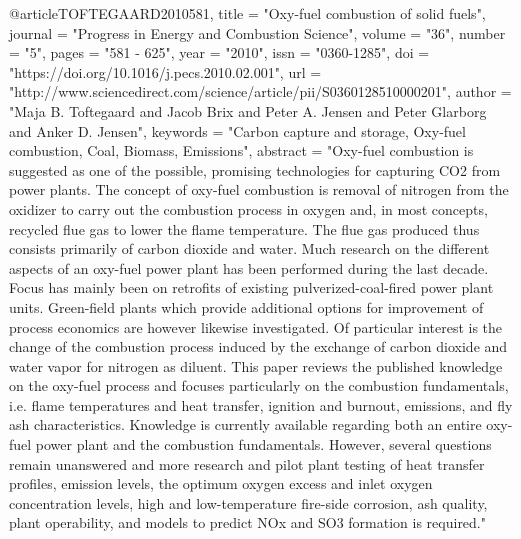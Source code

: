 @article{TOFTEGAARD2010581,
	title = "Oxy-fuel combustion of solid fuels",
	journal = "Progress in Energy and Combustion Science",
	volume = "36",
	number = "5",
	pages = "581 - 625",
	year = "2010",
	issn = "0360-1285",
	doi = "https://doi.org/10.1016/j.pecs.2010.02.001",
	url = "http://www.sciencedirect.com/science/article/pii/S0360128510000201",
	author = "Maja B. Toftegaard and Jacob Brix and Peter A. Jensen and Peter Glarborg and Anker D. Jensen",
	keywords = "Carbon capture and storage, Oxy-fuel combustion, Coal, Biomass, Emissions",
	abstract = "Oxy-fuel combustion is suggested as one of the possible, promising technologies for capturing CO2 from power plants. The concept of oxy-fuel combustion is removal of nitrogen from the oxidizer to carry out the combustion process in oxygen and, in most concepts, recycled flue gas to lower the flame temperature. The flue gas produced thus consists primarily of carbon dioxide and water. Much research on the different aspects of an oxy-fuel power plant has been performed during the last decade. Focus has mainly been on retrofits of existing pulverized-coal-fired power plant units. Green-field plants which provide additional options for improvement of process economics are however likewise investigated. Of particular interest is the change of the combustion process induced by the exchange of carbon dioxide and water vapor for nitrogen as diluent. This paper reviews the published knowledge on the oxy-fuel process and focuses particularly on the combustion fundamentals, i.e. flame temperatures and heat transfer, ignition and burnout, emissions, and fly ash characteristics. Knowledge is currently available regarding both an entire oxy-fuel power plant and the combustion fundamentals. However, several questions remain unanswered and more research and pilot plant testing of heat transfer profiles, emission levels, the optimum oxygen excess and inlet oxygen concentration levels, high and low-temperature fire-side corrosion, ash quality, plant operability, and models to predict NOx and SO3 formation is required."
}
